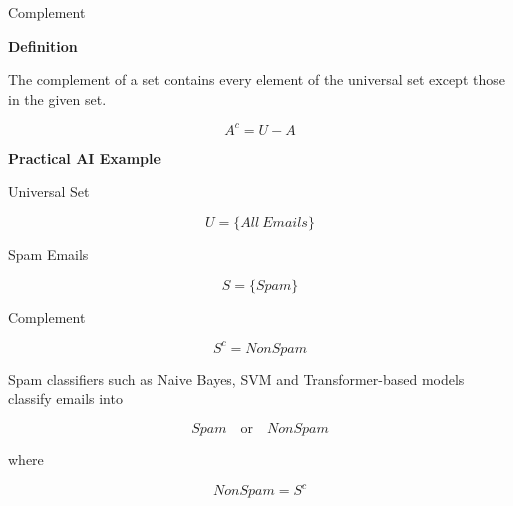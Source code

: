 \documentclass[aspectratio=169]{beamer}
\begin{document}
\begin{frame}{Complement}

\textbf{Definition}

The complement of a set contains every element of the
universal set except those in the given set.

\[
A^c
=
U-A
\]

\vspace{0.4cm}

\textbf{Practical AI Example}

Universal Set

\[
U=
\{
All\ Emails
\}
\]

Spam Emails

\[
S=
\{
Spam
\}
\]

Complement

\[
S^c
=
NonSpam
\]

Spam classifiers such as Naive Bayes, SVM and
Transformer-based models classify emails into

\[
Spam
\quad\text{or}\quad
NonSpam
\]

where

\[
NonSpam=S^c
\]







\end{frame}
\end{document}
